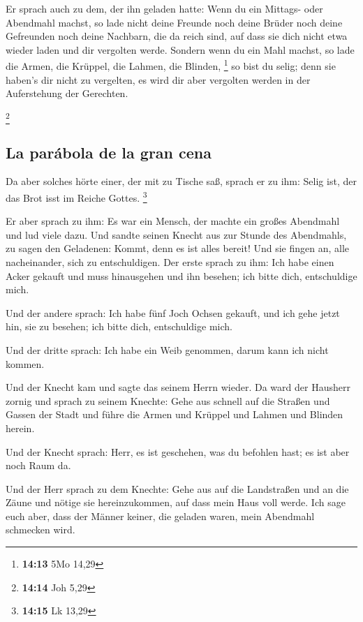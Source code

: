  Er sprach auch zu dem, der ihn geladen hatte: Wenn du
ein Mittags- oder Abendmahl machst, so lade nicht deine Freunde noch
deine Brüder noch deine Gefreunden noch deine Nachbarn, die da reich
sind, auf dass sie dich nicht etwa wieder laden und dir vergolten werde.
 Sondern wenn du ein Mahl machst, so lade die Armen, die
Krüppel, die Lahmen, die Blinden, \footnote{\textbf{14:13} 5Mo 14,29}
 so bist du selig; denn sie haben's dir nicht zu
vergelten, es wird dir aber vergolten werden in der Auferstehung der
Gerechten.

\footnote{\textbf{14:14} Joh 5,29}

\hypertarget{la-paruxe1bola-de-la-gran-cena}{%
\subsection{La parábola de la gran
cena}\label{la-paruxe1bola-de-la-gran-cena}}

 Da aber solches hörte einer, der mit zu Tische saß,
sprach er zu ihm: Selig ist, der das Brot isst im Reiche Gottes.
\footnote{\textbf{14:15} Lk 13,29}

 Er aber sprach zu ihm: Es war ein Mensch, der machte ein
großes Abendmahl und lud viele dazu.  Und sandte seinen
Knecht aus zur Stunde des Abendmahls, zu sagen den Geladenen: Kommt,
denn es ist alles bereit!  Und sie fingen an, alle
nacheinander, sich zu entschuldigen. Der erste sprach zu ihm: Ich habe
einen Acker gekauft und muss hinausgehen und ihn besehen; ich bitte
dich, entschuldige mich.

 Und der andere sprach: Ich habe fünf Joch Ochsen
gekauft, und ich gehe jetzt hin, sie zu besehen; ich bitte dich,
entschuldige mich.

 Und der dritte sprach: Ich habe ein Weib genommen, darum
kann ich nicht kommen.

 Und der Knecht kam und sagte das seinem Herrn wieder. Da
ward der Hausherr zornig und sprach zu seinem Knechte: Gehe aus schnell
auf die Straßen und Gassen der Stadt und führe die Armen und Krüppel und
Lahmen und Blinden herein.

 Und der Knecht sprach: Herr, es ist geschehen, was du
befohlen hast; es ist aber noch Raum da.

 Und der Herr sprach zu dem Knechte: Gehe aus auf die
Landstraßen und an die Zäune und nötige sie hereinzukommen, auf dass
mein Haus voll werde.  Ich sage euch aber, dass der
Männer keiner, die geladen waren, mein Abendmahl schmecken wird.

